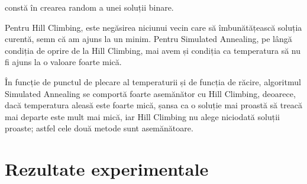 \documentclass[paper=a4, fontsize=11pt]{scrartcl}
\begin{document}
\underline{} constă în crearea random a unei soluții binare. 

Pentru Hill Climbing, \underline{} este negăsirea niciunui vecin care să îmbunătățească soluția curentă, semn că am ajuns la un minim. Pentru Simulated Annealing, pe lângă condiția de oprire de la Hill Climbing, mai avem și condiția ca temperatura să nu fi ajuns la o valoare foarte mică.

În funcție de punctul de plecare al temperaturii și de funcția de răcire, algoritmul Simulated Annealing se comportă foarte asemănător cu Hill Climbing, deoarece, dacă temperatura aleasă este foarte mică, șansa ca o soluție mai proastă să treacă mai departe este mult mai mică, iar Hill Climbing nu alege niciodată soluții proaste; astfel cele două metode sunt asemănătoare.

\section{Rezultate experimentale}
\end{document}

